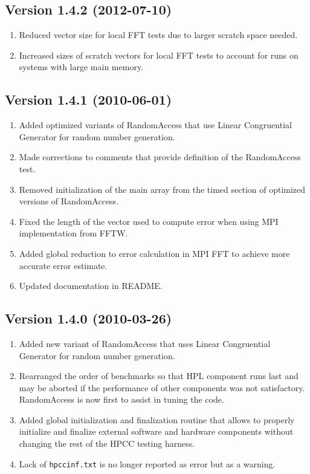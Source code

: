 \documentclass[twocolumn]{article}
\begin{document}
\subsection{Version 1.4.2 (2012-07-10)}
\begin{enumerate}
\item Reduced vector size for local FFT tests due to larger scratch space needed.
\item Increased sizes of scratch vectors for local FFT tests to account for runs on systems with large main memory.
\end{enumerate}

\subsection{Version 1.4.1 (2010-06-01)}
\begin{enumerate}
\item Added optimized variants of RandomAccess that use Linear Congruential Generator for random number generation.
\item Made corrections to comments that provide definition of the RandomAccess test.
\item Removed initialization of the main array from the timed section of optimized versions of RandomAccess.
\item Fixed the length of the vector used to compute error when using MPI implementation from FFTW.
\item Added global reduction to error calculation in MPI FFT to achieve more accurate error estimate.
\item Updated documentation in README.
\end{enumerate}

\subsection{Version 1.4.0 (2010-03-26)}
\begin{enumerate}
\item Added new variant of RandomAccess that uses Linear Congruential Generator for random number generation.
\item Rearranged the order of benchmarks so that HPL component runs last and may be aborted
if the performance of other components was not satisfactory. RandomAccess is now first to assist in tuning
the code.
\item Added global initialization and finalization routine that allows to properly initialize
and finalize external software and hardware components without changing the rest of the HPCC testing harness.
\item Lack of \texttt{hpccinf.txt} is no longer reported as error but as a warning.
\end{enumerate}
\end{document}
